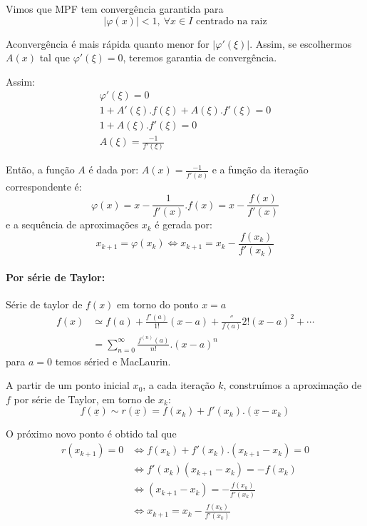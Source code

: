 \documentclass{article}
\begin{document}
            Vimos que MPF tem convergência garantida para
            \[|\varphi(x)| < 1,~\forall x \in I \text{ centrado na raiz}\]

            Aconvergência é mais rápida quanto menor for $|\varphi'(\xi)|$. Assim, se escolhermos $A(x)$ tal que $\varphi'(\xi) = 0$, teremos garantia de convergência.

            Assim:
            \begin{gather*}
                \varphi'(\xi) = 0\\
                1 + A'(\xi).f(\xi) + A(\xi).f'(\xi) = 0\\
                1 + A(\xi).f'(\xi) = 0\\
                A(\xi) = \frac{-1}{f'(\xi)}
            \end{gather*}
            
            Então, a função $A$ é dada por: $A(x) = \frac{-1}{f'(x)}$ e a função da iteração correspondente é:
            \[\varphi(x) = x - \frac{1}{f'(x)}.f(x) = \boxed{x - \frac{f(x)}{f'(x)}}\]
            e a sequência de aproximações $x_k$ é gerada por:
            \[\boxed{x_{k+1} = \varphi(x_k) \iff x_{k+1} = x_k - \frac{f(x_k)}{f'(x_k)}}\]

            \paragraph{Por série de Taylor:}
            Série de taylor de $f(x)$ em torno do ponto $x =a$
            \begin{align*}
                f(x) &\simeq f(a) + \frac{f'(a)}{1!}(x-a) + \frac''{f(a)}{2!}{(x-a)}^2 + \cdots\\
                &= \sum_{n = 0}^{\infty} \frac{f^{(n)}(a)}{n!}.{(x - a)}^n
            \end{align*}
            para $a = 0$ temos séried e MacLaurin.

            A partir de um ponto inicial $x_0$, a cada iteração $k$, construímos a aproximação de $f$ por série de Taylor, em torno de $x_k$:
            \[f(\underline{x}) \sim r(\underline{x}) = f(x_k) + f'(x_k).(\underline{x} - x_k)\]

            O próximo novo ponto é obtido tal que
            \begin{align*}
                r(x_{k+1}) = 0 &\iff f(x_k) + f'(x_k).(x_{k+1}-x_k) = 0\\
                               &\iff f'(x_k)(x_{k+1} - x_k) = -f(x_k)\\
                               &\iff (x_{k+1} - x_k) = -\frac{f(x_k)}{f'(x_k)}\\
                               &\iff \boxed{x_{k+1} = x_k - \frac{f(x_k)}{f'(x_k)}}\\
            \end{align*}
           
\end{document}
